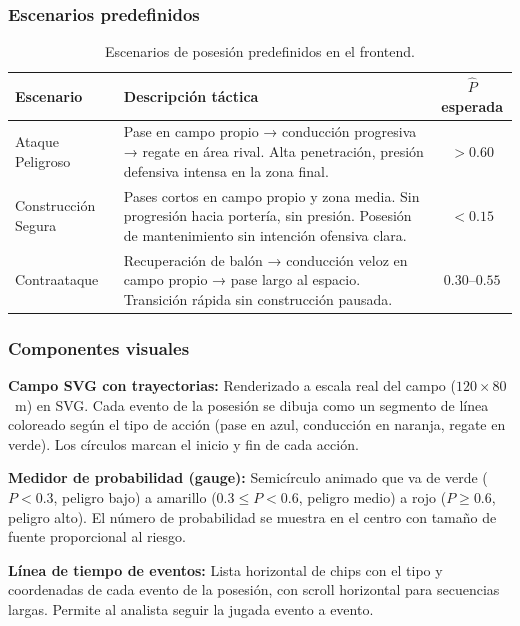 \documentclass[12pt,a4paper]{article}
\begin{document}
\subsubsection{Escenarios predefinidos}

\begin{table}[H]
\centering
\caption{Escenarios de posesión predefinidos en el frontend.}
\begin{tabularx}{\linewidth}{lXc}
\toprule
\textbf{Escenario} & \textbf{Descripción táctica} & \textbf{$\hat{P}$ esperada} \\
\midrule
Ataque Peligroso
    & Pase en campo propio → conducción progresiva → regate en área rival.
      Alta penetración, presión defensiva intensa en la zona final.
    & $> 0.60$ \\
\addlinespace
Construcción Segura
    & Pases cortos en campo propio y zona media. Sin progresión hacia portería,
      sin presión. Posesión de mantenimiento sin intención ofensiva clara.
    & $< 0.15$ \\
\addlinespace
Contraataque
    & Recuperación de balón → conducción veloz en campo propio → pase largo
      al espacio. Transición rápida sin construcción pausada.
    & $0.30$--$0.55$ \\
\bottomrule
\end{tabularx}
\end{table}

\subsubsection{Componentes visuales}

\textbf{Campo SVG con trayectorias:} Renderizado a escala real del campo
($120 \times 80$~m) en SVG. Cada evento de la posesión se dibuja como un segmento
de línea coloreado según el tipo de acción (pase en azul, conducción en naranja,
regate en verde). Los círculos marcan el inicio y fin de cada acción.

\textbf{Medidor de probabilidad (gauge):} Semicírculo animado que va de verde
($P < 0.3$, peligro bajo) a amarillo ($0.3 \leq P < 0.6$, peligro medio) a rojo
($P \geq 0.6$, peligro alto). El número de probabilidad se muestra en el centro
con tamaño de fuente proporcional al riesgo.

\textbf{Línea de tiempo de eventos:} Lista horizontal de chips con el tipo y
coordenadas de cada evento de la posesión, con scroll horizontal para secuencias
largas. Permite al analista seguir la jugada evento a evento.
\end{document}
